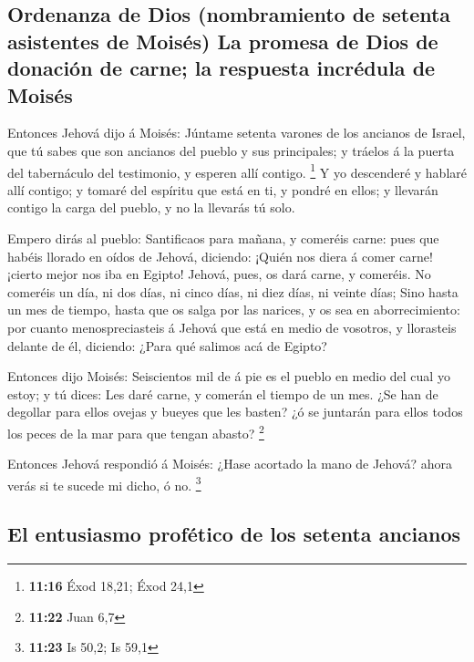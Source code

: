 \hypertarget{ordenanza-de-dios-nombramiento-de-setenta-asistentes-de-moisuxe9s-la-promesa-de-dios-de-donaciuxf3n-de-carne-la-respuesta-incruxe9dula-de-moisuxe9s}{%
\subsection{Ordenanza de Dios (nombramiento de setenta asistentes de
Moisés) La promesa de Dios de donación de carne; la respuesta incrédula
de
Moisés}\label{ordenanza-de-dios-nombramiento-de-setenta-asistentes-de-moisuxe9s-la-promesa-de-dios-de-donaciuxf3n-de-carne-la-respuesta-incruxe9dula-de-moisuxe9s}}

 Entonces Jehová dijo á Moisés: Júntame setenta varones
de los ancianos de Israel, que tú sabes que son ancianos del pueblo y
sus principales; y tráelos á la puerta del tabernáculo del testimonio, y
esperen allí contigo. \footnote{\textbf{11:16} Éxod 18,21; Éxod 24,1}
 Y yo descenderé y hablaré allí contigo; y tomaré del
espíritu que está en ti, y pondré en ellos; y llevarán contigo la carga
del pueblo, y no la llevarás tú solo.

 Empero dirás al pueblo: Santificaos para mañana, y
comeréis carne: pues que habéis llorado en oídos de Jehová, diciendo:
¡Quién nos diera á comer carne! ¡cierto mejor nos iba en Egipto! Jehová,
pues, os dará carne, y comeréis.  No comeréis un día, ni
dos días, ni cinco días, ni diez días, ni veinte días; 
Sino hasta un mes de tiempo, hasta que os salga por las narices, y os
sea en aborrecimiento: por cuanto menospreciasteis á Jehová que está en
medio de vosotros, y llorasteis delante de él, diciendo: ¿Para qué
salimos acá de Egipto?

 Entonces dijo Moisés: Seiscientos mil de á pie es el
pueblo en medio del cual yo estoy; y tú dices: Les daré carne, y comerán
el tiempo de un mes.  ¿Se han de degollar para ellos
ovejas y bueyes que les basten? ¿ó se juntarán para ellos todos los
peces de la mar para que tengan abasto? \footnote{\textbf{11:22} Juan
  6,7}

 Entonces Jehová respondió á Moisés: ¿Hase acortado la
mano de Jehová? ahora verás si te sucede mi dicho, ó no. \footnote{\textbf{11:23}
  Is 50,2; Is 59,1}

\hypertarget{el-entusiasmo-profuxe9tico-de-los-setenta-ancianos}{%
\subsection{El entusiasmo profético de los setenta
ancianos}\label{el-entusiasmo-profuxe9tico-de-los-setenta-ancianos}}

